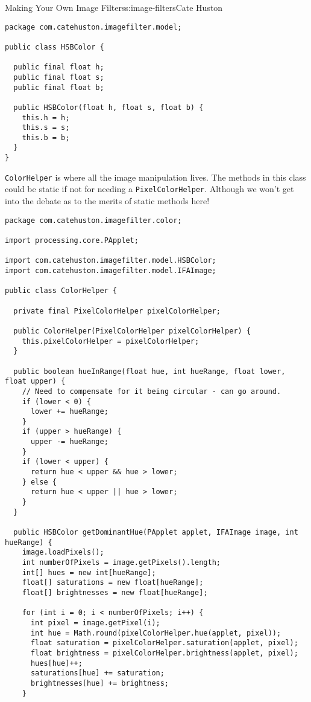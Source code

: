 \begin{aosachapter}{Making Your Own Image Filters}{s:image-filters}{Cate Huston}
\begin{verbatim}
package com.catehuston.imagefilter.model;

public class HSBColor {

  public final float h;
  public final float s;
  public final float b;

  public HSBColor(float h, float s, float b) {
    this.h = h;
    this.s = s;
    this.b = b;
  }
}
\end{verbatim}

\label{colorhelper-and-associated-tests}

\texttt{ColorHelper} is where all the image manipulation lives. The
methods in this class could be static if not for needing a
\texttt{PixelColorHelper}. Although we won't get into the debate as to
the merits of static methods here!

\begin{verbatim}
package com.catehuston.imagefilter.color;

import processing.core.PApplet;

import com.catehuston.imagefilter.model.HSBColor;
import com.catehuston.imagefilter.model.IFAImage;

public class ColorHelper {

  private final PixelColorHelper pixelColorHelper;

  public ColorHelper(PixelColorHelper pixelColorHelper) {
    this.pixelColorHelper = pixelColorHelper;
  }

  public boolean hueInRange(float hue, int hueRange, float lower, float upper) {
    // Need to compensate for it being circular - can go around.
    if (lower < 0) {
      lower += hueRange;
    }
    if (upper > hueRange) {
      upper -= hueRange;
    }
    if (lower < upper) {
      return hue < upper && hue > lower;
    } else {
      return hue < upper || hue > lower;
    }
  }

  public HSBColor getDominantHue(PApplet applet, IFAImage image, int hueRange) {
    image.loadPixels();
    int numberOfPixels = image.getPixels().length;
    int[] hues = new int[hueRange];
    float[] saturations = new float[hueRange];
    float[] brightnesses = new float[hueRange];

    for (int i = 0; i < numberOfPixels; i++) {
      int pixel = image.getPixel(i);
      int hue = Math.round(pixelColorHelper.hue(applet, pixel));
      float saturation = pixelColorHelper.saturation(applet, pixel);
      float brightness = pixelColorHelper.brightness(applet, pixel);
      hues[hue]++;
      saturations[hue] += saturation;
      brightnesses[hue] += brightness;
    }


\end{verbatim}
\end{aosachapter}
